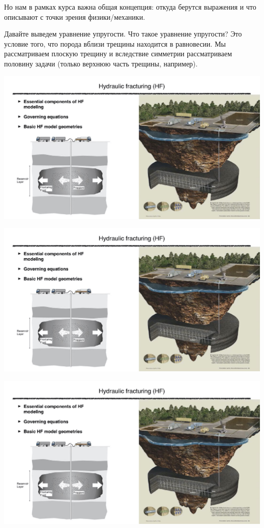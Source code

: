 \documentclass[main.tex]{subfiles}
\begin{document}
Но нам в рамках курса важна общая концепция: откуда берутся выражения и что описывают с точки зрения физики/механики.

Давайте выведем уравнение упругости.
Что такое уравнение упругости?
Это условие того, что порода вблизи трещины находится в равновесии.
Мы рассматриваем плоскую трещину и вследствие симметрии рассматриваем половину задачи (только верхнюю часть трещины, например).

\includegraphics[width=\textwidth, page=10]{HF_slides.pdf}

\includegraphics[width=\textwidth, page=11]{HF_slides.pdf}

\includegraphics[width=\textwidth, page=12]{HF_slides.pdf}
\end{document}
